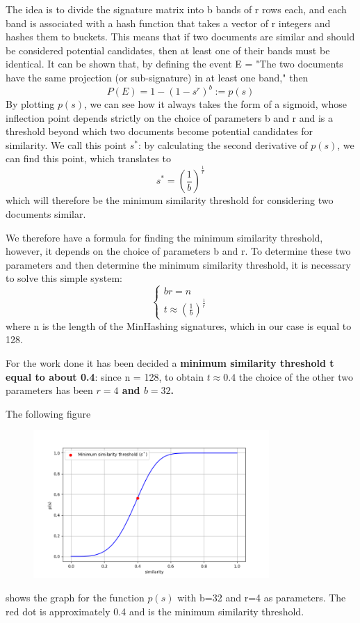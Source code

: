 \documentclass[12pt, a4paper]{article}
\begin{document}
The idea is to divide the signature matrix into b bands of r rows each, and each band is associated with a hash function that takes a vector of r integers and hashes them to buckets. This means that if two documents are similar and should be considered potential candidates, then at least one of their bands must be identical. It can be shown that, by defining the event E = "The two documents have the same projection (or sub-signature) in at least one band," then
\begin{equation}
    P(E) = 1-(1-s^r)^b := p(s)
\end{equation}
By plotting $p(s)$, we can see how it always takes the form of a sigmoid, whose inflection point depends strictly on the choice of parameters b and r and is a threshold beyond which two documents become potential candidates for similarity. We call this point $s^*$: by calculating the second derivative of $p(s)$, we can find this point, which translates to
\begin{equation}
    s^* = (\frac{1}{b})^\frac{1}{r}
\end{equation}
which will therefore be the minimum similarity threshold for considering two documents similar.

We therefore have a formula for finding the minimum similarity threshold, however, it depends on the choice of parameters b and r. To determine these two parameters and then determine the minimum similarity threshold, it is necessary to solve this simple system: 
\begin{equation}
    \begin{cases}
        br = n \\ t \approx (\frac{1}{b})^\frac{1}{r}
    \end{cases}
\end{equation}
where n is the length of the MinHashing signatures, which in our case is equal to 128. 

For the work done it has been decided a \textbf{minimum similarity threshold t equal to about 0.4}: since n = 128, to obtain $t \approx 0.4$ the choice of the other two parameters has been \textbf{$r=4$ and $b=32$.}

The following figure
\begin{figure}[H]
    \centering
    \includegraphics[width=0.8\textwidth]{Screenshot_1.png}
    \label{fig:placeholder}
\end{figure}
shows the graph for the function $p(s)$ with b=32 and r=4 as parameters. The red dot is approximately 0.4 and is the minimum similarity threshold.
\end{document}
